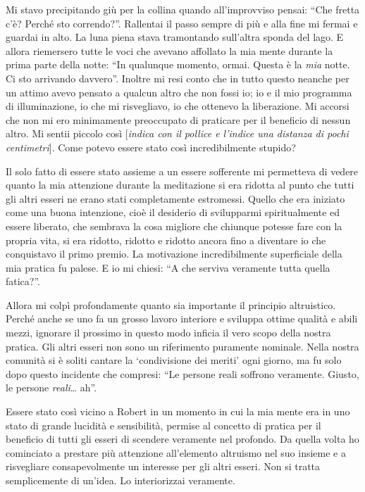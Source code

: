 Mi stavo precipitando giù per la collina quando all'improvviso pensai: ``Che fretta c'è? Perché sto correndo?''. Rallentai il passo sempre di più e alla fine mi fermai e guardai in alto. La luna piena stava tramontando sull'altra sponda del lago. E allora riemersero tutte le voci che avevano affollato la mia mente durante la prima parte della notte: ``In qualunque momento, ormai. Questa è la \textit{mia} notte. Ci sto arrivando davvero''. Inoltre mi resi conto che in tutto questo neanche per un attimo avevo pensato a qualcun altro che non fossi io; io e il mio programma di illuminazione, io che mi risvegliavo, io che ottenevo la liberazione. Mi accorsi che non mi ero minimamente preoccupato di praticare per il beneficio di nessun altro. Mi sentii piccolo così $[$\textit{indica con il pollice e l'indice una distanza di pochi centimetri}$]$. Come potevo essere stato così incredibilmente stupido?

Il solo fatto di essere stato assieme a un essere sofferente mi permetteva di vedere quanto la mia attenzione durante la meditazione si era ridotta al punto che tutti gli altri esseri ne erano stati completamente estromessi. Quello che era iniziato come una buona intenzione, cioè il desiderio di svilupparmi spiritualmente ed essere liberato, che sembrava la cosa migliore che chiunque potesse fare con la propria vita, si era ridotto, ridotto e ridotto ancora fino a diventare io che conquistavo il primo premio. La motivazione incredibilmente superficiale della mia pratica fu palese. E io mi chiesi: ``A che serviva veramente tutta quella fatica?''.

Allora mi colpì profondamente quanto sia importante il principio altruistico. Perché anche se uno fa un grosso lavoro interiore e sviluppa ottime qualità e abili mezzi, ignorare il prossimo in questo modo inficia il vero scopo della nostra pratica. Gli altri esseri non sono un riferimento puramente nominale. Nella nostra comunità si è soliti cantare la `condivisione dei meriti' ogni giorno, ma fu solo dopo questo incidente che compresi: ``Le persone reali soffrono veramente. Giusto, le persone \textit{reali}\ldots{} ah''.

Essere stato così vicino a Robert in un momento in cui la mia mente era in uno stato di grande lucidità e sensibilità, permise al concetto di pratica per il beneficio di tutti gli esseri di scendere veramente nel profondo. Da quella volta ho cominciato a prestare più attenzione all'elemento altruismo nel suo insieme e a risvegliare consapevolmente un interesse per gli altri esseri. Non si tratta semplicemente di un'idea. Lo interiorizzai veramente.

